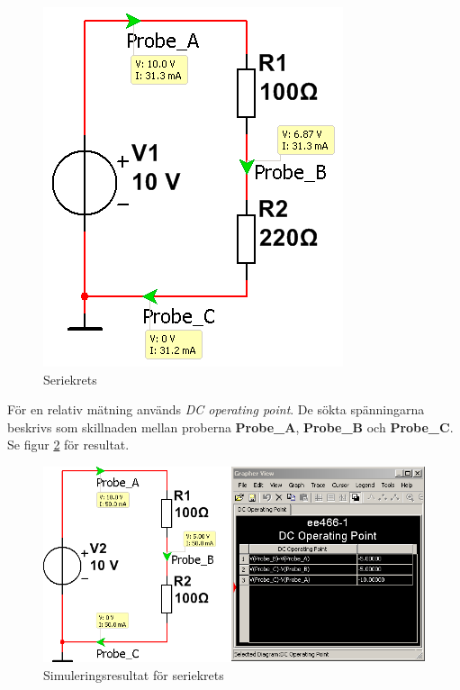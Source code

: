 \documentclass[11pt,a4paper]{article}
\begin{document}
\begin{figure}[htbp]
    \centering
    \includegraphics[scale=0.5]{ee466multisim/1.png}
    \caption{Seriekrets}
    \label{fig:sim2}
\end{figure}

För en relativ mätning används \emph{DC operating point}. De sökta spänningarna
beskrivs som skillnaden mellan proberna \textbf{Probe\_A}, \textbf{Probe\_B} och
\textbf{Probe\_C}. Se figur \ref{fig:sim2op} för resultat.

\begin{figure}[htbp]
    \centering
    \includegraphics[scale=0.5]{ee466multisim/1-op.png}
    \caption{Simuleringsresultat för seriekrets}
    \label{fig:sim2op}
\end{figure}
\end{document}
